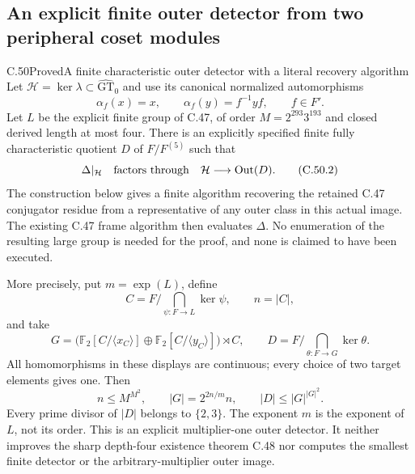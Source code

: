 \subsection{An explicit finite outer detector from two peripheral coset modules}

\begin{statement}{C.50}{Proved}{A finite characteristic outer detector with a literal recovery algorithm}
Let $\mathcal H=\ker\lambda\subset\widehat{\mathrm{GT}}_0$ and
use its canonical normalized automorphisms
\[
             \alpha_f(x)=x,\qquad \alpha_f(y)=f^{-1}yf,
                    \qquad f\in F'.                     \tag{C.50.1}
\]
Let $L$ be the explicit finite group of C.47, of order
$M=2^{293}3^{193}$ and closed derived length at most four.
There is an explicitly specified finite fully characteristic quotient
$D$ of $F/F^{(5)}$ such that
\[
       \Delta|_{\mathcal H}\quad\hbox{factors through}\quad
              \mathcal H\longrightarrow\operatorname{Out}(D).
                                                               \tag{C.50.2}
\]
The construction below gives a finite algorithm recovering the retained
C.47 conjugator residue from a representative of any outer class in
this actual image. The existing C.47 frame algorithm then evaluates
$\Delta$. No enumeration of the resulting large group is needed for
the proof, and none is claimed to have been executed.

More precisely, put $m=\exp(L)$, define
\[
 C=F\Big/\bigcap_{\psi:F\to L}\ker\psi,
                    \qquad n=|C|,
                                                               \tag{C.50.3}
\]
and take
\[
 G=\bigl(\mathbb F_2[C/\langle x_C\rangle]
          \oplus\mathbb F_2[C/\langle y_C\rangle]\bigr)\rtimes C,
 \qquad
 D=F\Big/\bigcap_{\theta:F\to G}\ker\theta.           \tag{C.50.4}
\]
All homomorphisms in these displays are continuous; every choice of
two target elements gives one. Then
\[
 n\le M^{M^2},\qquad |G|=2^{2n/m}n,
                    \qquad |D|\le |G|^{|G|^2}.        \tag{C.50.5}
\]
Every prime divisor of $|D|$ belongs to $\{2,3\}$.
The exponent $m$ is the exponent of $L$, not its order.
This is an explicit multiplier-one outer detector. It neither
improves the sharp depth-four existence theorem C.48 nor computes
the smallest finite detector or the arbitrary-multiplier outer image.
\end{statement}

